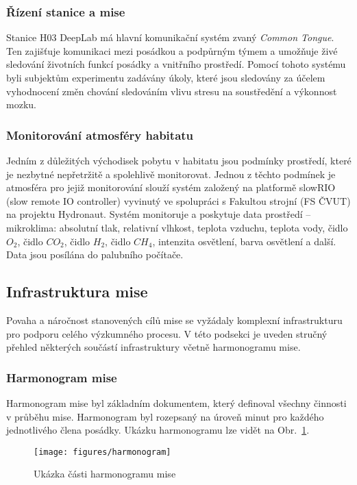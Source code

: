 \subsubsection{Řízení stanice a mise}
\label{subsubsec:rizeni_stanice_mise}
Stanice H03 DeepLab má hlavní komunikační systém zvaný \textit{Common Tongue}.
Ten zajišťuje komunikaci mezi posádkou a podpůrným týmem a umožňuje živé
sledování životních funkcí posádky a vnitřního prostředí. Pomocí tohoto systému
byli subjektům experimentu zadávány úkoly, které jsou sledovány za účelem
vyhodnocení změn chování sledováním vlivu stresu na soustředění a výkonnost
mozku.

\subsubsection{Monitorování atmosféry habitatu}
Jedním z důležitých východisek pobytu v habitatu jsou podmínky prostředí, které
je nezbytné nepřetržitě a spolehlivě monitorovat. Jednou z těchto podmínek je
atmosféra pro jejiž monitorování slouží systém založený na platformě slowRIO
(slow remote IO controller) vyvinutý ve spolupráci s Fakultou strojní (FS ČVUT)
na projektu Hydronaut. Systém monitoruje a poskytuje data prostředí --
mikroklima: absolutní tlak, relativní vlhkost, teplota vzduchu, teplota vody,
čidlo $O_2$, čidlo $CO_2$, čidlo $H_2$, čidlo $CH_4$, intenzita osvětlení, barva
osvětlení a další. Data jsou posílána do palubního počítače.

\subsection{Infrastruktura mise}
\label{subsec:infrastruktura_mise}
Povaha a náročnost stanovených cílů mise se vyžádaly komplexní infrastrukturu
pro podporu celého výzkumného procesu. V této podsekci je uveden stručný přehled
některých součástí infrastruktury včetně harmonogramu mise. 

\subsubsection{Harmonogram mise}
\label{subsubsec:harmonogram_mise}
Harmonogram mise byl základním dokumentem, který definoval všechny činnosti v
průběhu mise. Harmonogram byl rozepsaný na úroveň minut pro každého jednotlivého
člena posádky. Ukázku harmonogramu lze vidět na Obr.~\ref{fig:harmonogram}. 

\begin{figure}[h]
    \begin{center}
        \texttt{[image: figures/harmonogram]}
        \caption{Ukázka části harmonogramu mise}
        \label{fig:harmonogram}
    \end{center}
\end{figure}


